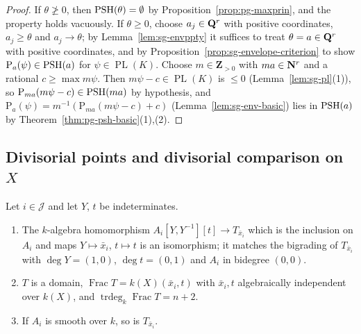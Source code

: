 \begin{proof}
If $\theta\not\ge0$, then $\operatorname{PSH}(\theta)=\emptyset$ by Proposition~\ref{prop:pg-maxprin}, and the property holds vacuously. If
$\theta\ge0$, choose $a_j\in\mathbf{Q}^r$ with positive coordinates, $a_j\ge\theta$ and $a_j\to\theta$; by Lemma~\ref{lem:sg-envppty} it
suffices to treat $\theta=a\in\mathbf{Q}^r$ with positive coordinates, and by Proposition~\ref{prop:sg-envelope-criterion} to show
$\mathrm P_a(\psi)\in\operatorname{PSH}(a)$ for $\psi\in\operatorname{PL}(K)$. Choose $m\in\mathbf{Z}_{>0}$ with $ma\in\mathbf{N}^r$ and a rational $c\ge\max m\psi$. Then
$m\psi-c\in\operatorname{PL}(K)$ is $\le0$ (Lemma~\ref{lem:sg-pl}(1)), so $\mathrm P_{ma}(m\psi-c)\in\operatorname{PSH}(ma)$ by hypothesis, and
$\mathrm P_a(\psi)=m^{-1}(\mathrm P_{ma}(m\psi-c)+c)$ (Lemma~\ref{lem:sg-env-basic}) lies in $\operatorname{PSH}(a)$ by
Theorem~\ref{thm:pg-psh-basic}(1),(2).
\end{proof}

\subsection{Divisorial points and divisorial comparison on \texorpdfstring{$X$}{X}}\label{subsec:sg-comparison}

\begin{lemma}\label{lem:sg-cone-charts}
\leanok
{}
Let $i\in\mathcal J$ and let $Y$, $t$ be indeterminates.
\begin{enumerate}
\item The $k$-algebra homomorphism $A_i[Y,Y^{-1}][t]\to T_{\bar x_i}$ which is the inclusion on $A_i$ and maps $Y\mapsto\bar x_i$,
$t\mapsto t$ is an isomorphism; it matches the bigrading of $T_{\bar x_i}$ with $\deg Y=(1,0)$, $\deg t=(0,1)$ and $A_i$ in
bidegree $(0,0)$.
\item $T$ is a domain, $\operatorname{Frac}T=k(X)(\bar x_i,t)$ with $\bar x_i,t$ algebraically independent over $k(X)$, and
$\operatorname{trdeg}_k\operatorname{Frac}T=n+2$.
\item If $A_i$ is smooth over $k$, so is $T_{\bar x_i}$.
\end{enumerate}
\end{lemma}

